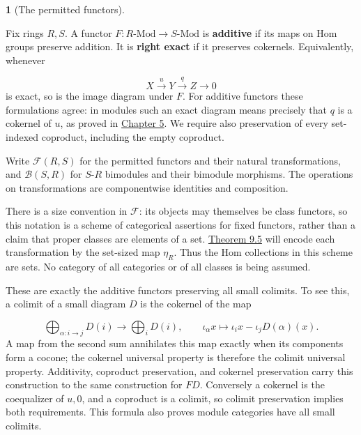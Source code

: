 \documentclass[11pt,a4paper]{article}
\newcommand{\mathheading}{}
\theoremstyle{plain}
\theoremstyle{definition}
\newtheorem*{definitionstatement}{\mathheading}
\newenvironment{mathdefinition}[3]{\renewcommand{\mathheading}{#1 #2}\begin{definitionstatement}[#3]}{\end{definitionstatement}}
\begin{document}
\begin{mathdefinition}{Definition}{9.1}{The permitted functors}
\label{env-9-1}

Fix rings \(R,S\). A functor \(F:R\text{-Mod}\to S\text{-Mod}\) is \textbf{additive} if its maps on Hom groups preserve addition. It is \textbf{right exact} if it preserves cokernels. Equivalently, whenever

 \[X\xrightarrow uY\xrightarrow qZ\longrightarrow0\] 
is exact, so is the image diagram under \(F\). For additive functors these formulations agree: in modules such an exact diagram means precisely that \(q\) is a cokernel of \(u\), as proved in \hyperref[chapter-05]{Chapter 5}. We require also preservation of every set-indexed coproduct, including the empty coproduct.

 
Write \(\mathscr F(R,S)\) for the permitted functors and their natural transformations, and \(\mathscr B(S,R)\) for \(S\)-\(R\) bimodules and their bimodule morphisms. The operations on transformations are componentwise identities and composition.

 
There is a size convention in \(\mathscr F\): its objects may themselves be class functors, so this notation is a scheme of categorical assertions for fixed functors, rather than a claim that proper classes are elements of a set. \hyperref[env-9-5]{Theorem 9.5} will encode each transformation by the set-sized map \(\eta_R\). Thus the Hom collections in this scheme are sets. No category of all categories or of all classes is being assumed.


\par{}\par

\end{mathdefinition}
 
These are exactly the additive functors preserving all small colimits. To see this, a colimit of a small diagram \(D\) is the cokernel of the map

 \[\bigoplus_{\alpha:i\to j}D(i)\longrightarrow\bigoplus_iD(i),\qquad \iota_\alpha x\longmapsto\iota_i x-\iota_j D(\alpha)(x).\] 
A map from the second sum annihilates this map exactly when its components form a cocone; the cokernel universal property is therefore the colimit universal property. Additivity, coproduct preservation, and cokernel preservation carry this construction to the same construction for \(FD\). Conversely a cokernel is the coequalizer of \(u,0\), and a coproduct is a colimit, so colimit preservation implies both requirements. This formula also proves module categories have all small colimits.
\end{document}
